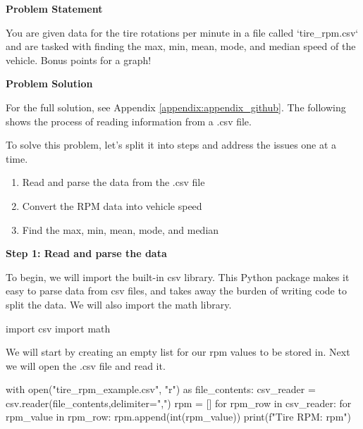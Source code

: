\begin{tcolorbox}[breakable, enhanced jigsaw, title=DEN 161: Assignment \ref{engg_prob_solve_assignment_1}, 
    colframe=ksu-purple, colback=ksu-gray]

    \textbf{Problem Statement}
    \parindent15pt

    You are given data for the tire rotations per minute in a file called `tire\_rpm.csv` and are tasked with 
    finding the max, min, mean, mode, and median speed of the vehicle. Bonus points for a graph!

    \tcblower
    \textbf{Problem Solution}
    \parindent15pt

    For the full solution, see Appendix \ref{appendix:appendix_github}. The following shows the process
    of reading information from a .csv file.
    
    To solve this problem, let's split it into steps and address the issues one at a time.

    \begin{enumerate}
        \item Read and parse the data from the .csv file
        \item Convert the RPM data into vehicle speed 
        \item Find the max, min, mean, mode, and median
    \end{enumerate}
    
    \noindent \textbf{Step 1: Read and parse the data}
    
    To begin, we will import the built-in csv library. This Python package makes it easy to parse data from csv 
    files, and takes away the burden of writing code to split the data. We will also import the math library.

\begin{python}
import csv
import math
\end{python}

    We will start by creating an empty list for our rpm values to be stored in. Next we will open the .csv 
    file and read it.

\begin{python}
with open("tire_rpm_example.csv", "r") as file_contents:
csv_reader = csv.reader(file_contents,delimiter=",")
rpm = []
for rpm_row in csv_reader:
    for rpm_value in rpm_row:
        rpm.append(int(rpm_value))
print(f"Tire RPM: {rpm}")
\end{python}
\end{tcolorbox}

